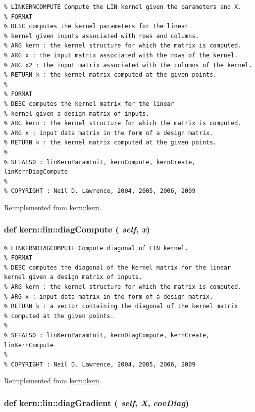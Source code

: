 \footnotesize\begin{verbatim}% LINKERNCOMPUTE Compute the LIN kernel given the parameters and X.
% FORMAT
% DESC computes the kernel parameters for the linear
% kernel given inputs associated with rows and columns.
% ARG kern : the kernel structure for which the matrix is computed.
% ARG x : the input matrix associated with the rows of the kernel.
% ARG x2 : the input matrix associated with the columns of the kernel.
% RETURN k : the kernel matrix computed at the given points.
%
% FORMAT
% DESC computes the kernel matrix for the linear
% kernel given a design matrix of inputs.
% ARG kern : the kernel structure for which the matrix is computed.
% ARG x : input data matrix in the form of a design matrix.
% RETURN k : the kernel matrix computed at the given points.
%
% SEEALSO : linKernParamInit, kernCompute, kernCreate, linKernDiagCompute
%
% COPYRIGHT : Neil D. Lawrence, 2004, 2005, 2006, 2009

\end{verbatim}
\normalsize
 

Reimplemented from \hyperlink{classkern_1_1kern}{kern::kern}.\hypertarget{classkern_1_1lin_006ba41a9245cb67da4a7d287b2423a5}{
\subsubsection[{diagCompute}]{\setlength{\rightskip}{0pt plus 5cm}def kern::lin::diagCompute ( {\em self}, \/   {\em x})}}
\label{classkern_1_1lin_006ba41a9245cb67da4a7d287b2423a5}




\footnotesize\begin{verbatim}% LINKERNDIAGCOMPUTE Compute diagonal of LIN kernel.
% FORMAT
% DESC computes the diagonal of the kernel matrix for the linear kernel given a design matrix of inputs.
% ARG kern : the kernel structure for which the matrix is computed.
% ARG x : input data matrix in the form of a design matrix.
% RETURN k : a vector containing the diagonal of the kernel matrix
% computed at the given points.
%
% SEEALSO : linKernParamInit, kernDiagCompute, kernCreate, linKernCompute
%
% COPYRIGHT : Neil D. Lawrence, 2004, 2005, 2006, 2009

\end{verbatim}
\normalsize
 

Reimplemented from \hyperlink{classkern_1_1kern}{kern::kern}.\hypertarget{classkern_1_1lin_82e5c69d97b96f51a2dc32df91393aab}{
\subsubsection[{diagGradient}]{\setlength{\rightskip}{0pt plus 5cm}def kern::lin::diagGradient ( {\em self}, \/   {\em X}, \/   {\em covDiag})}}
\label{classkern_1_1lin_82e5c69d97b96f51a2dc32df91393aab}




